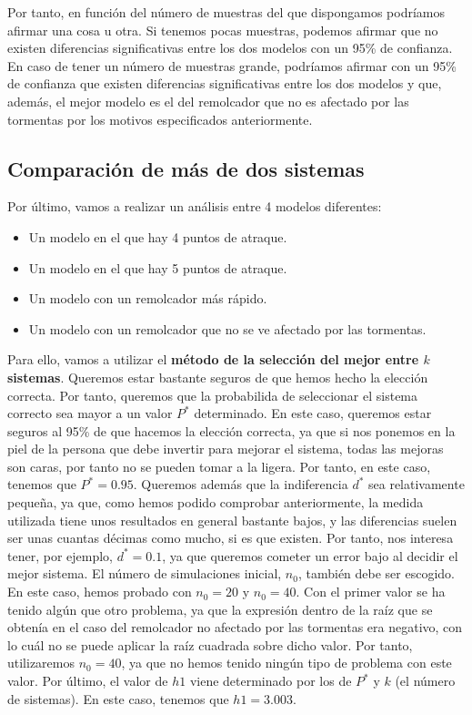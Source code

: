 \documentclass[11pt,a4paper]{article}
\begin{document}
Por tanto, en función del número de muestras del que dispongamos podríamos
afirmar una cosa u otra. Si tenemos pocas muestras, podemos afirmar que
no existen diferencias significativas entre los dos modelos con un 95\% de
confianza. En caso de tener un número de muestras grande, podríamos afirmar
con un 95\% de confianza que existen diferencias significativas entre los
dos modelos y que, además, el mejor modelo es el del remolcador que no es
afectado por las tormentas por los motivos especificados anteriormente.

\subsection{Comparación de más de dos sistemas}

Por último, vamos a realizar un análisis entre 4 modelos diferentes:

\begin{itemize}[label=\textbullet]
	\item Un modelo en el que hay 4 puntos de atraque.
	\item Un modelo en el que hay 5 puntos de atraque.
	\item Un modelo con un remolcador más rápido.
	\item Un modelo con un remolcador que no se ve afectado por las tormentas.
\end{itemize}

Para ello, vamos a utilizar el \textbf{método de la selección del mejor entre
$k$ sistemas}. Queremos estar bastante seguros de que hemos hecho la elección
correcta. Por tanto, queremos que la probabilida de seleccionar el sistema
correcto sea mayor a un valor $P^*$ determinado. En este caso, queremos estar
seguros al 95\% de que hacemos la elección correcta, ya que si nos ponemos en
la piel de la persona que debe invertir para mejorar el sistema, todas las mejoras
son caras, por tanto no se pueden tomar a la ligera. Por tanto, en este caso,
tenemos que $P^* = 0.95$. Queremos además que la indiferencia $d^*$ sea relativamente
pequeña, ya que, como hemos podido comprobar anteriormente, la medida utilizada
tiene unos resultados en general bastante bajos, y las diferencias suelen ser
unas cuantas décimas como mucho, si es que existen. Por tanto, nos interesa
tener, por ejemplo, $d^* = 0.1$, ya que queremos cometer un error bajo al decidir
el mejor sistema. El número de simulaciones inicial, $n_0$, también debe
ser escogido. En este caso, hemos probado con $n_0 = 20$ y $n_0 = 40$.
Con el primer valor se ha tenido algún que otro problema, ya que la expresión
dentro de la raíz que se obtenía en el caso del remolcador no afectado por las
tormentas era negativo, con lo cuál no se puede aplicar la raíz cuadrada sobre
dicho valor. Por tanto, utilizaremos $n_0 = 40$, ya que no hemos tenido ningún
tipo de problema con este valor. Por último, el valor de $h1$ viene determinado
por los de $P^*$ y $k$ (el número de sistemas). En este caso, tenemos que
$h1 = 3.003$.
\end{document}
